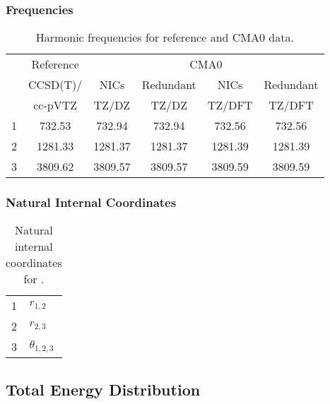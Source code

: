 \documentclass[10pt,oneside]{article}
\begin{document}
\begin{table}[h!]
\subsubsection*{Frequencies}
\centering
\caption{Harmonic frequencies for reference and CMA0 data.}
\begin{tabular}{cccccc}
\toprule
{} & Reference & \multicolumn{4}{c}{CMA0} \\
{} &  CCSD(T)/ &    NICs &  Redundant &    NICs & Redundant \\
{} &   cc-pVTZ &   TZ/DZ &      TZ/DZ &  TZ/DFT &    TZ/DFT \\
\midrule
1 &    732.53 &  732.94 &     732.94 &  732.56 &    732.56 \\
2 &   1281.33 & 1281.37 &    1281.37 & 1281.39 &   1281.39 \\
3 &   3809.62 & 3809.57 &    3809.57 & 3809.59 &   3809.59 \\
\bottomrule
\end{tabular}
\end{table}

\begin{table}[h!]
\subsubsection*{Natural Internal Coordinates}
\centering
\caption{Natural internal coordinates for .}
\small
\begin{tabular}{ll}
\toprule
  1   & $r_{1,2}$ \\
  2   & $r_{2,3}$ \\
  3   & $\theta_{1,2,3}$ \\
\bottomrule
\end{tabular}
\end{table}

\begin{table}
\subsection*{Total Energy Distribution}
\centering\end{table}

\clearpage

\subsection{}
\end{document}
